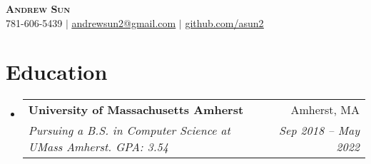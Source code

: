 \documentclass[letterpaper,11pt]{article}
\makeatletter
\newcommand{\resumeSubheading}[4]{
  \vspace{-2pt}\item
    \begin{tabular*}{0.97\textwidth}[t]{l@{\extracolsep{\fill}}r}
      \textbf{#1} & #2 \\
      \textit{\small#3} & \textit{\small #4} \\
    \end{tabular*}\vspace{-7pt}
}
\newcommand{\resumeSubHeadingListStart}{\begin{itemize}[leftmargin=0in, label={}]}
\newcommand{\resumeSubHeadingListEnd}{\end{itemize}}
\makeatother
\begin{document}

\begin{center}
    \textbf{\large \scshape Andrew Sun} \\ \vspace{1pt}
    \small 781-606-5439 $|$ \href{mailto:x@x.com}{\underline{andrewsun2@gmail.com}} $|$ 
    \href{https://github.com/asun2}{\underline{github.com/asun2}}
\end{center}


\section{Education}
  \resumeSubHeadingListStart
    \resumeSubheading
      {University of Massachusetts Amherst}{Amherst, MA}
      {Pursuing a B.S. in Computer Science at UMass Amherst. GPA: 3.54}{Sep 2018 -- May 2022}
  \resumeSubHeadingListEnd




\end{document}
